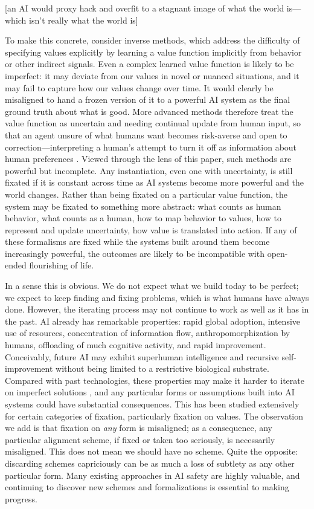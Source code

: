 \documentclass[11pt]{article}
\begin{document}
[an AI would proxy hack and overfit to a stagnant image of what the world is---which isn't really what the world is]

To make this concrete, consider inverse methods, which address the difficulty of specifying values explicitly by learning a value function implicitly from behavior or other indirect signals. Even a complex learned value function is likely to be imperfect: it may deviate from our values in novel or nuanced situations, and it may fail to capture how our values change over time. It would clearly be misaligned to hand a frozen version of it to a powerful AI system as the final ground truth about what is good. More advanced methods therefore treat the value function as uncertain and needing continual update from human input, so that an agent unsure of what humans want becomes risk-averse and open to correction---interpreting a human's attempt to turn it off as information about human preferences \citep{hadfieldmenell2016cooperative, jeon2020reward}. Viewed through the lens of this paper, such methods are powerful but incomplete. Any instantiation, even one with uncertainty, is still fixated if it is constant across time as AI systems become more powerful and the world changes. Rather than being fixated on a particular value function, the system may be fixated to something more abstract: what counts as human behavior, what counts as a human, how to map behavior to values, how to represent and update uncertainty, how value is translated into action. If any of these formalisms are fixed while the systems built around them become increasingly powerful, the outcomes are likely to be incompatible with open-ended flourishing of life.

In a sense this is obvious. We do not expect what we build today to be perfect; we expect to keep finding and fixing problems, which is what humans have always done. However, the iterating process may not continue to work as well as it has in the past. AI already has remarkable properties: rapid global adoption, intensive use of resources, concentration of information flow, anthropomorphization by humans, offloading of much cognitive activity, and rapid improvement. Conceivably, future AI may exhibit superhuman intelligence and recursive self-improvement without being limited to a restrictive biological substrate. Compared with past technologies, these properties may make it harder to iterate on imperfect solutions \citep{bostrom2014superintelligence}, and any particular forms or assumptions built into AI systems could have substantial consequences. This has been studied extensively for certain categories of fixation, particularly fixation on values. The observation we add is that fixation on \textit{any} form is misaligned; as a consequence, any particular alignment scheme, if fixed or taken too seriously, is necessarily misaligned. This does not mean we should have no scheme. Quite the opposite: discarding schemes capriciously can be as much a loss of subtlety as any other particular form. Many existing approaches in AI safety are highly valuable, and continuing to discover new schemes and formalizations is essential to making progress.
\end{document}
